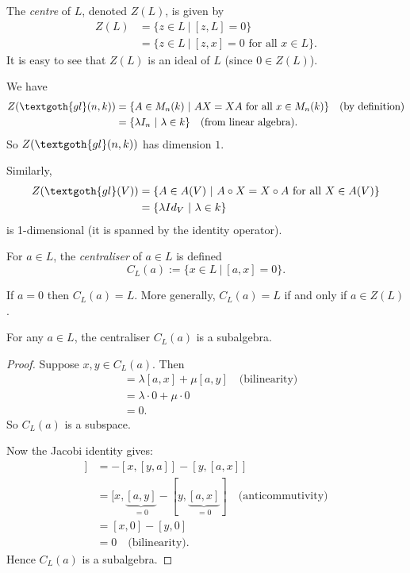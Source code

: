 \begin{definition}
	The \emph{centre} of $L$, denoted $Z(L)$, is given by
	\begin{align*}
		Z(L) &= \{z \in L\ |\ [z, L] = 0\} \\
			 &= \{z \in L\ |\ [z, x] = 0 \text{ for all } x \in L\}.
	\end{align*}
	It is easy to see that $Z(L)$ is an ideal of $L$ (since $0 \in Z(L)$).
\end{definition}

\begin{example}
	We have
	\begin{align*}
		Z(\textgoth{gl}(n, k)) &= \{A \in M_n(k)\ |\ AX = XA \text{ for all } x \in M_n(k)\} \quad \text{(by definition)} \\
			&= \{\lambda I_n\ |\ \lambda \in k\} \quad \text{(from linear algebra)}.
	\end{align*}
	So $Z(\textgoth{gl}(n, k))$ has dimension $1$.
	
	Similarly,
	\begin{align*}
		Z(\textgoth{gl}(V)) &= \{A \in A(V)\ |\ A \circ X = X \circ A \text{ for all } X \in A(V)\} \\
			&= \{\lambda Id_V\ |\ \lambda \in k\}
	\end{align*}
	is 1-dimensional (it is spanned by the identity operator).
\end{example}

\begin{definition}
	For $a \in L$, the \emph{centraliser} of $a \in L$ is defined
	\[
		C_L(a) := \{x \in L\ |\ [a, x] = 0\}.
	\]
\end{definition}

\begin{remark}
	If $a = 0$ then $C_L(a) = L$. More generally, $C_L(a) = L$ if and only if $a \in Z(L)$.
\end{remark}

\begin{lemma}
	For any $a \in L$, the centraliser $C_L(a)$ is a subalgebra.
	\begin{proof}
		Suppose $x, y \in C_L(a)$. Then
		\begin{align*}
			[a, \lambda x + \mu y] &= \lambda[a, x] + \mu[a, y] \quad \text{(bilinearity)} \\
				&= \lambda \cdot 0 + \mu \cdot 0 \\
				&= 0.
		\end{align*}
		So $C_L(a)$ is a subspace.
		
		Now the Jacobi identity gives:
		\begin{align*}
			[a, [x, y]] &= -[x, [y, a]] - [y, [a, x]] \\
					   &= [x, \underbrace{[a, y]}_{= 0} - [y, \underbrace{[a, x]}_{= 0}] \quad \text{(anticommutivity)} \\
					   &= [x, 0] - [y, 0] \\
					   &= 0 \quad \text{(bilinearity)}.
		\end{align*}
		Hence $C_L(a)$ is a subalgebra.
	\end{proof}
\end{lemma}

